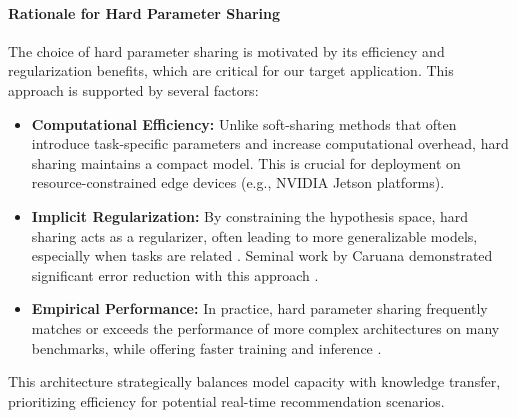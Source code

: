\paragraph*{Rationale for Hard Parameter Sharing}
The choice of hard parameter sharing is motivated by its efficiency and regularization benefits, which are critical for our target application. This approach is supported by several factors:
\begin{itemize}
    \item \textbf{Computational Efficiency:} Unlike soft-sharing methods that often introduce task-specific parameters and increase computational overhead, hard sharing maintains a compact model. This is crucial for deployment on resource-constrained edge devices (e.g., NVIDIA Jetson platforms).
    \item \textbf{Implicit Regularization:} By constraining the hypothesis space, hard sharing acts as a regularizer, often leading to more generalizable models, especially when tasks are related \cite{baxter2000model}. Seminal work by Caruana demonstrated significant error reduction with this approach \cite{caruana1997multitask}.
    \item \textbf{Empirical Performance:} In practice, hard parameter sharing frequently matches or exceeds the performance of more complex architectures on many benchmarks, while offering faster training and inference \cite{standley2020tasks}.
\end{itemize}
This architecture strategically balances model capacity with knowledge transfer, prioritizing efficiency for potential real-time recommendation scenarios.

